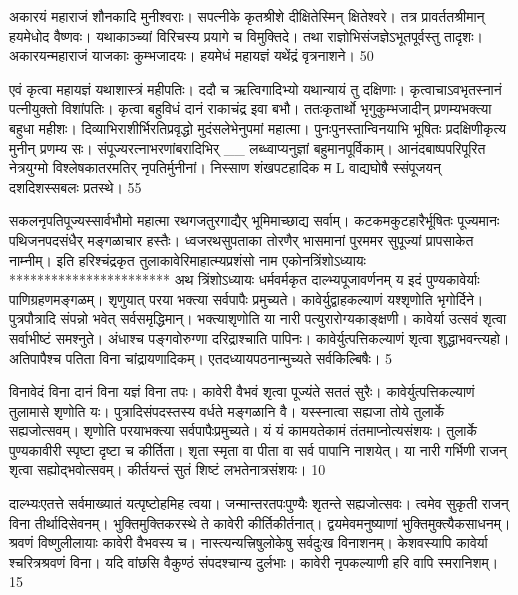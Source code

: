 अकारयं महाराजं शौनकादि मुनीश्वराः।
 सपत्नीके कृतश्रीशे दीक्षितेस्मिन् क्षितेश्वरे।
 तत्र प्रावर्ततश्रीमान् हयमेधोद वैष्णवः।
 यथाकाञ्च्यां विरिचस्य प्रयागे च विमुक्तिदे।
 तथा राज्ञोभिसंजज्ञेऽभूतपूर्वस्तु तादृशः।
 अकारयन्महाराजं याजकाः कुम्भजादयः।
 हयमेधं महायज्ञं यथेंद्रं वृत्रनाशने।
 50

  एवं कृत्वा महायज्ञं यथाशास्त्रं महीपतिः।
 ददौ च ऋत्विगादिभ्यो यथान्यायं तु दक्षिणाः।
 कृत्वाचाऽवभृतस्नानं पत्नीयुक्तो विशांपतिः।
 कृत्वा बहुविधं दानं राकाचंद्र इवा बभौ।
 ततःकृतार्थो भृगुकुम्भजादीन्
प्रणम्यभक्त्या बहुधा महीशः।
 दिव्याभिराशीर्भिरतिप्रवृद्धो
मुदंसलेभेनुपमां महात्मा।
 पुनःपुनस्तान्विनयाभि भूषितः
प्रदक्षिणीकृत्य मुनीन् प्रणम्य सः।
 संपूज्यरत्नाभरणांबरादिभिर्
__ लब्ध्वाप्यनुज्ञां बहुमानपूर्विकाम्।
 आनंदबाष्पपरिपूरित नेत्रयुग्मो
विश्लेषकातरमतिर् नृपतिर्मुनीनां।
 निस्साण शंखपटहादिक
म
L
वाद्यघोषै स्संपूजयन् दशदिशस्सबलः प्रतस्थे।
55

 सकलनृपतिपूज्यस्सार्वभौमो महात्मा
रथगजतुरगाद्यैर् भूमिमाच्छाद्य सर्वाम्।
 कटकमकुटहारैर्भूषितः पूज्यमानः
पथिजनपदसंधैर् मङ्गळाचार हस्तैः।
 ध्वजरथसुपताका तोरणैर् भासमानां
पुरममर सुपूज्यां प्रापसाकेत नाम्नीम्।
 इति हरिश्चंद्रकृत तुलाकावेरिमाहात्म्यप्रशंसो नाम
एकोनत्रिंशोऽध्यायः
***********************
अथ त्रिंशोऽध्यायः
धर्मवर्मकृत दाल्भ्यपूजावर्णनम् य इदं पुण्यकावेर्याः पाणिग्रहणमङ्गळम्।
 शृणुयात् परया भक्त्या सर्वपापैः प्रमुच्यते।
 कावेर्युद्वाहकल्याणं यश्शृणोति भृगोर्दिने।
 पुत्रपौत्रादि संपन्नो भवेत् सर्वसमृद्धिमान्।
 भक्त्याशृणोति या नारी पत्युरारोग्यकाङ्क्षणी।
 कावेर्या उत्सवं शृत्वा सर्वाभीष्टं समश्नुते।
 अंधाश्च पङ्गवोरुग्णा दरिद्राश्चाति पापिनः।
 कावेर्युत्पत्तिकल्याणं शृत्वा शुद्धाभवन्त्यहो।
 अतिपापैश्च पतिता विना चांद्रायणादिकम्।
 एतदध्यायपठनान्मुच्यते सर्वकिल्बिषैः।
 5

 
विनावेदं विना दानं विना यज्ञं विना तपः।
 कावेरी वैभवं शृत्वा पूज्यंते सततं सुरैः।
 कावेर्युत्पत्तिकल्याणं तुलामासे शृणोति यः।
 पुत्रादिसंपदस्तस्य वर्धते मङ्गळानि वै।
 यस्स्नात्वा सह्यजा तोये तुलार्के सह्यजोत्सवम्।
 शृणोति परयाभक्त्या सर्वपापैःप्रमुच्यते।
 यं यं कामयतेकामं तंतमाप्नोत्यसंशयः।
 तुलार्के पुण्यकावीरी स्पृष्टा दृष्टा च कीर्तिता।
 शृता स्मृता वा पीता वा सर्व पापानि नाशयेत्।
 या नारी गर्भिणी राजन् शृत्वा सह्योद्भवोत्सवम्।
 कीर्तयन्तं सुतं शिष्टं लभतेनात्रसंशयः।
 10

  दाल्भ्यःएतत्ते सर्वमाख्यातं यत्पृष्टोहमिह त्वया।
 जन्मान्तरतपःपुण्यैः शृतन्ते सह्यजोत्सवः।
 त्वमेव सुकृती राजन् विना तीर्थादिसेवनम्।
 भुक्तिमुक्तिकरस्थे ते कावेरी कीर्तिकीर्तनात्।
 द्वयमेवमनुष्याणां भुक्तिमुक्त्यैकसाधनम्।
 श्रवणं विष्णुलीलायाः कावेरी वैभवस्य च।
 नास्त्यन्यत्त्रिषुलोकेषु सर्वदुःख विनाशनम्।
 केशवस्यापि कावेर्या श्चरित्रश्रवणं विना।
 यदि वांछसि वैकुण्ठं संपदश्चान्य दुर्लभाः।
 कावेरी नृपकल्याणी हरि वापि स्मरानिशम्।
 15

